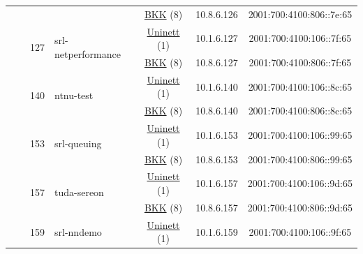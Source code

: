 \begin{small}
\begin{center}
\begin{longtable}{|c|c|c|c|c|c|c|c|}
  &  &  &  & \multicolumn{2}{|c|}{\tiny{\href{http://bkk.no}{BKK} (8)}} & \tiny{10.8.6.126} & \tiny{2001:700:4100:806::7e:65} \\* \cline{3-3}\cline{4-4}\cline{5-5}\cline{6-6}\cline{7-7}\cline{8-8}
  &  & \multirow{2}{*}{\tiny{127}} & \multicolumn{1}{|l|}{\multirow{2}{*}{\tiny{srl-netperformance}}} & \multicolumn{2}{|c|}{\tiny{\href{https://www.uninett.no}{Uninett} (1)}} & \tiny{10.1.6.127} & \tiny{2001:700:4100:106::7f:65} \\* \cline{5-5}\cline{6-6}\cline{7-7}\cline{8-8}
  &  &  &  & \multicolumn{2}{|c|}{\tiny{\href{http://bkk.no}{BKK} (8)}} & \tiny{10.8.6.127} & \tiny{2001:700:4100:806::7f:65} \\* \cline{3-3}\cline{4-4}\cline{5-5}\cline{6-6}\cline{7-7}\cline{8-8}
  &  & \multirow{2}{*}{\tiny{140}} & \multicolumn{1}{|l|}{\multirow{2}{*}{\tiny{ntnu-test}}} & \multicolumn{2}{|c|}{\tiny{\href{https://www.uninett.no}{Uninett} (1)}} & \tiny{10.1.6.140} & \tiny{2001:700:4100:106::8c:65} \\* \cline{5-5}\cline{6-6}\cline{7-7}\cline{8-8}
  &  &  &  & \multicolumn{2}{|c|}{\tiny{\href{http://bkk.no}{BKK} (8)}} & \tiny{10.8.6.140} & \tiny{2001:700:4100:806::8c:65} \\* \cline{3-3}\cline{4-4}\cline{5-5}\cline{6-6}\cline{7-7}\cline{8-8}
  &  & \multirow{2}{*}{\tiny{153}} & \multicolumn{1}{|l|}{\multirow{2}{*}{\tiny{srl-queuing}}} & \multicolumn{2}{|c|}{\tiny{\href{https://www.uninett.no}{Uninett} (1)}} & \tiny{10.1.6.153} & \tiny{2001:700:4100:106::99:65} \\* \cline{5-5}\cline{6-6}\cline{7-7}\cline{8-8}
  &  &  &  & \multicolumn{2}{|c|}{\tiny{\href{http://bkk.no}{BKK} (8)}} & \tiny{10.8.6.153} & \tiny{2001:700:4100:806::99:65} \\* \cline{3-3}\cline{4-4}\cline{5-5}\cline{6-6}\cline{7-7}\cline{8-8}
  &  & \multirow{2}{*}{\tiny{157}} & \multicolumn{1}{|l|}{\multirow{2}{*}{\tiny{tuda-sereon}}} & \multicolumn{2}{|c|}{\tiny{\href{https://www.uninett.no}{Uninett} (1)}} & \tiny{10.1.6.157} & \tiny{2001:700:4100:106::9d:65} \\* \cline{5-5}\cline{6-6}\cline{7-7}\cline{8-8}
  &  &  &  & \multicolumn{2}{|c|}{\tiny{\href{http://bkk.no}{BKK} (8)}} & \tiny{10.8.6.157} & \tiny{2001:700:4100:806::9d:65} \\* \cline{3-3}\cline{4-4}\cline{5-5}\cline{6-6}\cline{7-7}\cline{8-8}
  &  & \multirow{2}{*}{\tiny{159}} & \multicolumn{1}{|l|}{\multirow{2}{*}{\tiny{srl-nndemo}}} & \multicolumn{2}{|c|}{\tiny{\href{https://www.uninett.no}{Uninett} (1)}} & \tiny{10.1.6.159} & \tiny{2001:700:4100:106::9f:65} \\* \cline{5-5}\cline{6-6}\cline{7-7}\cline{8-8}

\end{longtable}
\end{center}
\end{small}
